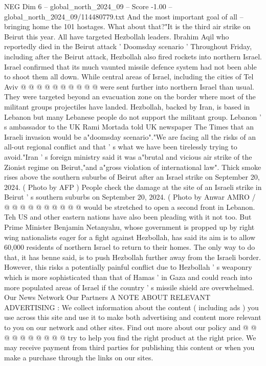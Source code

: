 \begin{textsample}{NEG Dim 6 – global\_north\_2024\_09 – Score -1.00 – global\_north\_2024\_09/114480779.txt}
And the most important goal of all -- bringing home the 101 hostages.
What about that?"It is the third air strike on Beirut this year.
All have targeted Hezbollah leaders.
Ibrahim Aqil who reportedly died in the Beirut attack ' Doomsday scenario ' Throughout Friday, including after the Beirut attack, Hezbollah also fired rockets into northern Israel.
Israel confirmed that its much vaunted missile defence system had not been able to shoot them all down.
While central areas of Israel, including the cities of Tel Aviv @ @ @ @ @ @ @ @ @ @ were sent further into northern Israel than usual.
They were targeted beyond an evacuation zone on the border where most of the militant groups projectiles have landed.
Hezbollah, backed by Iran, is based in Lebanon but many Lebanese people do not support the militant group.
Lebanon ' s ambassador to the UK Rami Mortada told UK newspaper The Times that an Israeli invasion would be a"doomsday scenario"."We are facing all the risks of an all-out regional conflict and that ' s what we have been tirelessly trying to avoid."Iran ' s foreign ministry said it was a"brutal and vicious air strike of the Zionist regime on Beirut,"and a"gross violation of international law".
Thick smoke rises above the southern suburbs of Beirut after an Israel strike on September 20, 2024. ( Photo by AFP ) People check the damage at the site of an Israeli strike in Beirut ' s southern suburbs on September 20, 2024. ( Photo by Anwar AMRO / @ @ @ @ @ @ @ @ @ @ would be stretched to open a second front in Lebanon.
Teh US and other eastern nations have also been pleading with it not too.
But Prime Minister Benjamin Netanyahu, whose government is propped up by right wing nationalists eager for a fight against Hezbollah, has said its aim is to allow 60,000 residents of northern Israel to return to their homes.
The only way to do that, it has benne said, is to push Hezbollah further away from the Israeli border.
However, this risks a potentially painful conflict due to Hezbollah ' s weaponry which is more sophisticated than that of Hamas ' in Gaza and could reach into more populated areas of Israel if the country ' s missile shield are overwhelmed.
Our News Network Our Partners A NOTE ABOUT RELEVANT ADVERTISING : We collect information about the content ( including ads ) you use across this site and use it to make both advertising and content more relevant to you on our network and other sites.
Find out more about our policy and @ @ @ @ @ @ @ @ @ @ try to help you find the right product at the right price.
We may receive payment from third parties for publishing this content or when you make a purchase through the links on our sites.

\end{textsample}
